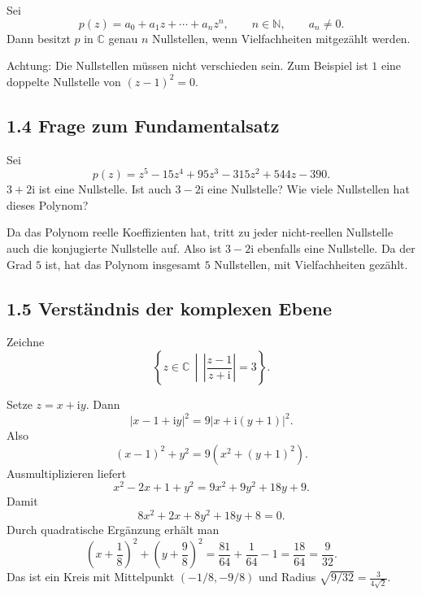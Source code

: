 \documentclass[11pt,a4paper]{article}
\newcommand{\C}{\mathbb C}
\newcommand{\N}{\mathbb N}
\newcommand{\ii}{\mathrm i}
\begin{document}
\begin{importantbox}
Sei
\[
p(z)=a_0+a_1z+\cdots+a_nz^n,
\qquad n\in\N,
\qquad a_n\neq0.
\]
Dann besitzt $p$ in $\C$ genau $n$ Nullstellen, wenn Vielfachheiten mitgezählt werden.
\end{importantbox}
Achtung: Die Nullstellen müssen nicht verschieden sein. Zum Beispiel ist $1$ eine doppelte Nullstelle von $(z-1)^2=0$.

\subsection{1.4 Frage zum Fundamentalsatz}
\begin{fragebox}
Sei
\[
p(z)=z^5-15z^4+95z^3-315z^2+544z-390.
\]
$3+2\ii$ ist eine Nullstelle. Ist auch $3-2\ii$ eine Nullstelle? Wie viele Nullstellen hat dieses Polynom?
\end{fragebox}
\begin{antwortbox}
Da das Polynom reelle Koeffizienten hat, tritt zu jeder nicht-reellen Nullstelle auch die konjugierte Nullstelle auf. Also ist $3-2\ii$ ebenfalls eine Nullstelle. Da der Grad $5$ ist, hat das Polynom insgesamt $5$ Nullstellen, mit Vielfachheiten gezählt.
\end{antwortbox}

\subsection{1.5 Verständnis der komplexen Ebene}
\begin{fragebox}
Zeichne
\[
\left\{z\in\C\,\middle|\,\left|\frac{z-1}{z+\ii}\right|=3\right\}.
\]
\end{fragebox}
\begin{antwortbox}
Setze $z=x+\ii y$. Dann
\[
|x-1+\ii y|^2=9|x+\ii(y+1)|^2.
\]
Also
\[
(x-1)^2+y^2=9(x^2+(y+1)^2).
\]
Ausmultiplizieren liefert
\[
x^2-2x+1+y^2=9x^2+9y^2+18y+9.
\]
Damit
\[
8x^2+2x+8y^2+18y+8=0.
\]
Durch quadratische Ergänzung erhält man
\[
\left(x+\frac18\right)^2+\left(y+\frac98\right)^2=\frac{81}{64}+\frac{1}{64}-1=\frac{18}{64}=\frac{9}{32}.
\]
Das ist ein Kreis mit Mittelpunkt $(-1/8,-9/8)$ und Radius $\sqrt{9/32}=\frac{3}{4\sqrt2}$.
\end{antwortbox}

\begin{center}
\end{center}
\end{document}
